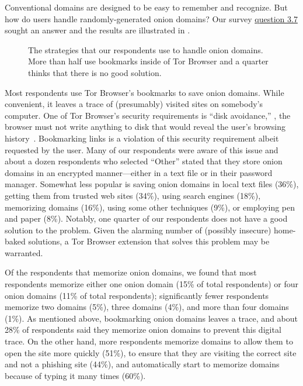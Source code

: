 Conventional domains are designed to be easy to remember and recognize.  But how
do users handle randomly-generated onion domains?  Our survey
\hyperref[q3_7]{question 3.7} sought an answer and the results are illustrated
in .

\begin{figure}[t]
    \centering
    
    \caption{The strategies that our respondents use to handle onion domains.
    More than half use bookmarks inside of Tor Browser and a quarter thinks that
    there is no good solution.}
    \label{fig:onion-domain-mgmt}
\end{figure}

Most respondents use Tor Browser's bookmarks to save onion domains.  While
convenient, it leaves a trace of (presumably) visited sites on somebody's
computer.  One of Tor Browser's security requirements is ``disk avoidance,''
\ie, the browser must not write anything to disk that would reveal the user's
browsing history~\cite[\S~2.1]{Perry2017a}.  Bookmarking links is a violation of
this security requirement albeit requested by the user.  Many of our respondents
were aware of this issue and about a dozen respondents who selected ``Other''
stated that they store onion domains in an encrypted manner---either in a text
file or in their password manager.  Somewhat less popular is saving onion
domains in local text files (36\%), getting them from trusted web sites (34\%),
using search engines (18\%), memorizing domains (16\%), using some other
techniques (9\%), or employing pen and paper (8\%).  Notably, one quarter of our
respondents does not have a good solution to the problem.  Given the alarming
number of (possibly insecure) home-baked solutions, a Tor Browser extension that
solves this problem may be warranted.

Of the respondents that memorize onion domains, we found that most respondents
memorize either one onion domain (15\% of total respondents) or four onion
domains (11\% of total respondents); significantly fewer respondents memorize
two domains (5\%), three domains (4\%), and more than four domains (1\%).  As
mentioned above, bookmarking onion domains leaves a trace, and about 28\% of
respondents said they memorize onion domains to prevent this digital trace.  On
the other hand, more respondents memorize domains \first to allow them to open
the site more quickly (51\%), \second to ensure that they are visiting the
correct site and not a phishing site (44\%), and \third automatically start to
memorize domains because of typing it many times (60\%).

